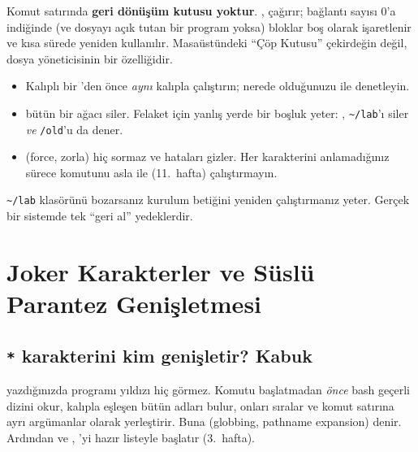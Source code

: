 \begin{keyidea}
Komut satırında \textbf{geri dönüşüm kutusu yoktur}. ,  çağırır; bağlantı sayısı $0$'a indiğinde (ve dosyayı açık tutan bir program yoksa) bloklar boş olarak işaretlenir ve kısa sürede yeniden kullanılır. Masaüstündeki ``Çöp Kutusu'' çekirdeğin değil, dosya yöneticisinin bir özelliğidir.
\begin{itemize}
  \item Kalıplı bir 'den önce \emph{aynı} kalıpla  çalıştırın; nerede olduğunuzu  ile denetleyin.
  \item {} bütün bir ağacı siler. Felaket için yanlış yerde bir boşluk yeter: , \texttt{\textasciitilde/lab}'ı siler \emph{ve} \texttt{/old}'u da dener.
  \item {} (force, zorla) hiç sormaz ve hataları gizler. Her karakterini anlamadığınız sürece  komutunu asla  ile (11.~hafta) çalıştırmayın.
\end{itemize}
\texttt{\textasciitilde/lab} klasörünü bozarsanız kurulum betiğini yeniden çalıştırmanız yeter. Gerçek bir sistemde tek ``geri al'' yedeklerdir.
\end{keyidea}

\section{Joker Karakterler ve Süslü Parantez Genişletmesi}
\label{sec:glob}

\subsection{\texttt{*} karakterini kim genişletir? Kabuk}

 yazdığınızda  programı yıldızı hiç görmez. Komutu başlatmadan \emph{önce} bash geçerli dizini okur, kalıpla eşleşen bütün adları bulur, onları sıralar ve komut satırına ayrı argümanlar olarak yerleştirir. Buna  (globbing, pathname expansion) denir. Ardından  ve , 'yi hazır listeyle başlatır (3.~hafta).

